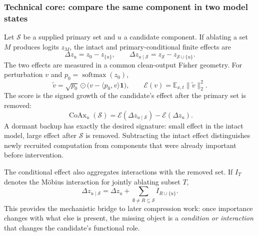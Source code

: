 \documentclass[12pt,a4paper]{article}
\newcommand{\Sset}{\mathcal{S}}
\begin{document}
\subsubsection{Technical core: compare the same component in two model states}
Let $\Sset$ be a supplied primary set and $u$ a candidate component. If ablating a set $M$ produces logits $z_M$, the intact and primary-conditional finite effects are
\begin{equation}
\Delta z_u=z_0-z_{\{u\}},\qquad
\Delta z_{u\mid\Sset}=z_{\Sset}-z_{\Sset\cup\{u\}}.
\label{eq:coax-effects}
\end{equation}
The two effects are measured in a common clean-output Fisher geometry. For perturbation $v$ and $p_0=\operatorname{softmax}(z_0)$,
\begin{equation}
\widetilde v=\sqrt{p_0}\odot\bigl(v-\langle p_0,v\rangle\mathbf 1\bigr),\qquad
\mathcal E(v)=\mathbb E_{x,t}\|\widetilde v\|_2^2.
\label{eq:coax-energy}
\end{equation}
The score is the signed growth of the candidate's effect after the primary set is removed:
\begin{equation}
\operatorname{CoAx}_u(\Sset)=\mathcal E(\Delta z_{u\mid\Sset})-\mathcal E(\Delta z_u).
\label{eq:coax}
\end{equation}
A dormant backup has exactly the desired signature: small effect in the intact model, large effect after $\Sset$ is removed. Subtracting the intact effect distinguishes newly recruited computation from components that were already important before intervention.

The conditional effect also aggregates interactions with the removed set. If $I_T$ denotes the M\"obius interaction for jointly ablating subset $T$,
\begin{equation}
\Delta z_{u\mid\Sset}=\Delta z_u+\sum_{\emptyset\neq R\subseteq\Sset} I_{R\cup\{u\}}.
\label{eq:coax-allorder}
\end{equation}
This provides the mechanistic bridge to later compression work: once importance changes with what else is present, the missing object is a \emph{condition or interaction} that changes the candidate's functional role.
\end{document}
